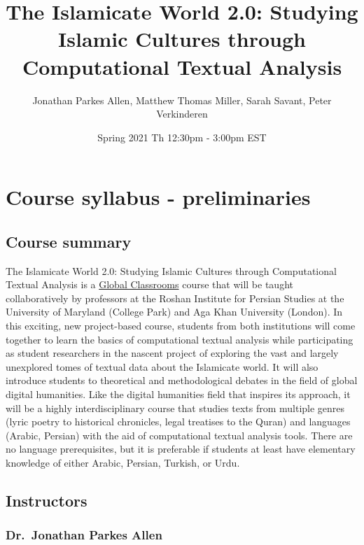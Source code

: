 \documentclass[
]{book}
\title{The Islamicate World 2.0: Studying Islamic Cultures through Computational Textual Analysis}
\author{Jonathan Parkes Allen, Matthew Thomas Miller, Sarah Savant, Peter Verkinderen}
\date{Spring 2021 Th 12:30pm - 3:00pm EST}
\begin{document}
\maketitle

{
\setcounter{tocdepth}{1}
\tableofcontents
}
\hypertarget{course-syllabus---preliminaries}{%
\chapter{Course syllabus - preliminaries}\label{course-syllabus---preliminaries}}

\hypertarget{course-summary}{%
\section{Course summary}\label{course-summary}}

The Islamicate World 2.0: Studying Islamic Cultures through Computational Textual Analysis is a \href{https://globalmaryland.umd.edu/content/global-classrooms}{Global Classrooms} course that will be taught collaboratively by professors at the Roshan Institute for Persian Studies at the University of Maryland (College Park) and Aga Khan University (London). In this exciting, new project-based course, students from both institutions will come together to learn the basics of computational textual analysis while participating as student researchers in the nascent project of exploring the vast and largely unexplored tomes of textual data about the Islamicate world. It will also introduce students to theoretical and methodological debates in the field of global digital humanities. Like the digital humanities field that inspires its approach, it will be a highly interdisciplinary course that studies texts from multiple genres (lyric poetry to historical chronicles, legal treatises to the Quran) and languages (Arabic, Persian) with the aid of computational textual analysis tools. There are no language prerequisites, but it is preferable if students at least have elementary knowledge of either Arabic, Persian, Turkish, or Urdu.

\hypertarget{instructors}{%
\section{Instructors}\label{instructors}}

\hypertarget{dr.-jonathan-parkes-allen}{%
\subsection{Dr.~Jonathan Parkes Allen}\label{dr.-jonathan-parkes-allen}}
\end{document}
